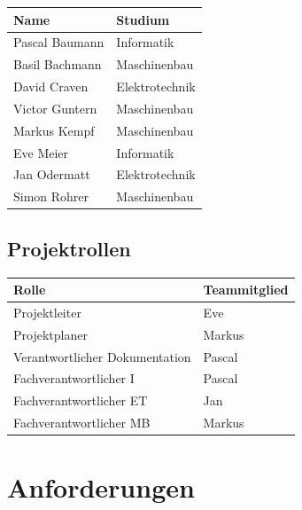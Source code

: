 \documentclass[a4paper]{report}
\begin{document}
\begin{tabular}{|l|l|}
	\hline 
	\textbf{Name} & \textbf{Studium} \\ 
	\hline 
	Pascal Baumann & Informatik \\ 
	\hline 
	Basil Bachmann & Maschinenbau \\ 
	\hline 
	David Craven & Elektrotechnik \\ 
	\hline 
	Victor Guntern & Maschinenbau \\ 
	\hline
	Markus Kempf & Maschinenbau \\ 
	\hline  
	Eve Meier & Informatik \\ 
	\hline 
	Jan Odermatt & Elektrotechnik \\
	\hline
	Simon Rohrer & Maschinenbau \\
	\hline
\end{tabular} 

\section{Projektrollen}

\begin{tabular}{|l|l|}
	\hline 
	\textbf{Rolle} & \textbf{Teammitglied} \\ 
	\hline 
	Projektleiter & Eve \\ 
	\hline 
	Projektplaner & Markus \\ 
	\hline 
	Verantwortlicher Dokumentation & Pascal \\ 
	\hline 
	Fachverantwortlicher I & Pascal \\ 
	\hline 
	Fachverantwortlicher ET & Jan \\ 
	\hline 
	Fachverantwortlicher MB & Markus \\ 
	\hline 
\end{tabular} 

\chapter{Anforderungen}
\end{document}
